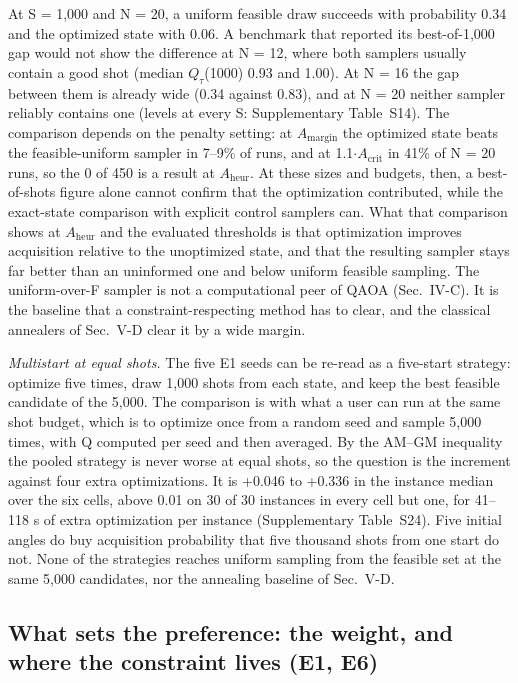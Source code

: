 \documentclass[journal]{IEEEtran}
\begin{document}
At S = 1,000 and N = 20, a uniform feasible draw succeeds with probability 0.34 and the optimized state with 0.06. A benchmark that reported its best-of-1,000 gap would not show the difference at N = 12, where both samplers usually contain a good shot (median $Q_{\tau}$(1000) 0.93 and 1.00). At N = 16 the gap between them is already wide (0.34 against 0.83), and at N = 20 neither sampler reliably contains one (levels at every S: Supplementary Table~S14). The comparison depends on the penalty setting: at $A_{\mathrm{margin}}$ the optimized state beats the feasible-uniform sampler in 7--9\% of runs, and at 1.1$\cdot$$A_{\mathrm{crit}}$ in 41\% of N = 20 runs, so the 0 of 450 is a result at $A_{\mathrm{heur}}$. At these sizes and budgets, then, a best-of-shots figure alone cannot confirm that the optimization contributed, while the exact-state comparison with explicit control samplers can. What that comparison shows at $A_{\mathrm{heur}}$ and the evaluated thresholds is that optimization improves acquisition relative to the unoptimized state, and that the resulting sampler stays far better than an uninformed one and below uniform feasible sampling. The uniform-over-F sampler is not a computational peer of QAOA (Sec.~IV-C). It is the baseline that a constraint-respecting method has to clear, and the classical annealers of Sec.~V-D clear it by a wide margin.


\textit{Multistart at equal shots.} The five E1 seeds can be re-read as a five-start strategy: optimize five times, draw 1,000 shots from each state, and keep the best feasible candidate of the 5,000. The comparison is with what a user can run at the same shot budget, which is to optimize once from a random seed and sample 5,000 times, with Q computed per seed and then averaged. By the AM--GM inequality the pooled strategy is never worse at equal shots, so the question is the increment against four extra optimizations. It is +0.046 to +0.336 in the instance median over the six cells, above 0.01 on 30 of 30 instances in every cell but one, for 41--118 s of extra optimization per instance (Supplementary Table~S24). Five initial angles do buy acquisition probability that five thousand shots from one start do not. None of the strategies reaches uniform sampling from the feasible set at the same 5,000 candidates, nor the annealing baseline of Sec.~V-D.


\subsection{What sets the preference: the weight, and where the constraint lives (E1, E6)}
\end{document}
